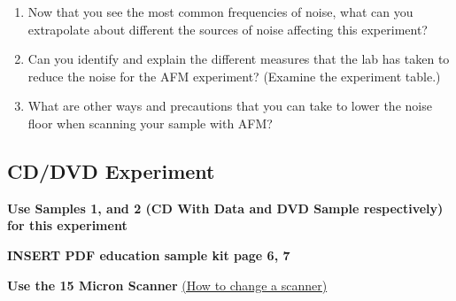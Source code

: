 \documentclass{../lab}
\begin{document}
\begin{enumerate}
    \item Now that you see the most common frequencies of noise, what can you extrapolate about different the sources of noise affecting this experiment?

    \item Can you identify and explain the different measures that the lab has taken to reduce the noise for the AFM experiment? (Examine the experiment table.)

    \item What are other ways and precautions that you can take to lower the noise floor when scanning your sample with AFM?

\end{enumerate}

\subsection{CD/DVD Experiment}
\label{subsec:CD/DVD}

\textbf{Use Samples 1, and 2 (CD With Data and DVD Sample respectively) for this experiment}

\textbf{INSERT PDF education sample kit page 6, 7}

\textbf{Use the 15 Micron Scanner} \hyperref[subsec:ChangingScanners]{(How to change a scanner)}
\end{document}
